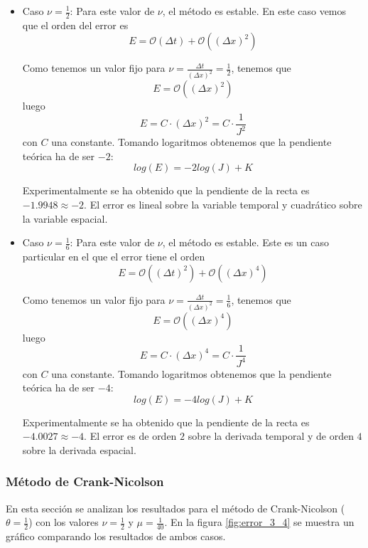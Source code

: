 \documentclass[spanish]{mathnotes}
\begin{document}
	
	\begin{itemize}
		\item Caso $\nu = \frac{1}{2}$: Para este valor de $\nu$, el método es estable. En este caso vemos que el orden del error es
		$$E = \mathcal{O}(\Delta t) + \mathcal{O}((\Delta x)^2)$$
		
		Como tenemos un valor fijo para $\nu=\frac{\Delta t}{(\Delta x)^2}=\frac{1}{2}$, tenemos que 
		$$E = \mathcal{O}((\Delta x)^2)$$
		luego 
		$$E = C\cdot (\Delta x)^2 = C\cdot\frac{1}{J^2}$$ 
		con $C$ una constante. Tomando logaritmos obtenemos que la pendiente teórica ha de ser $-2$:
		$$log(E) = -2log(J) + K$$
		
		Experimentalmente se ha obtenido que la pendiente de la recta es $-1.9948\approx -2$. El error es lineal sobre la variable temporal y cuadrático sobre la variable espacial.
		
		\item Caso $\nu = \frac{1}{6}$: Para este valor de $\nu$, el método es estable. Este es un caso particular en el que el error tiene el orden
		$$E = \mathcal{O}\left((\Delta t)^2\right) + \mathcal{O}\left((\Delta x)^4\right)$$
		
		Como tenemos un valor fijo para $\nu=\frac{\Delta t}{(\Delta x)^2}=\frac{1}{6}$, tenemos que 
		$$E = \mathcal{O}((\Delta x)^4)$$
		luego 
		$$E = C\cdot (\Delta x)^4 = C\cdot\frac{1}{J^4}$$ 
		con $C$ una constante. Tomando logaritmos obtenemos que la pendiente teórica ha de ser $-4$:
		$$log(E) = -4log(J) + K$$
		
		Experimentalmente se ha obtenido que la pendiente de la recta es $-4.0027\approx -4$.  El error es de orden $2$ sobre la derivada temporal y de orden $4$ sobre la derivada espacial.
	\end{itemize}
	
	\subsubsection{Método de Crank-Nicolson}
	En esta sección se analizan los resultados para el método de Crank-Nicolson ($\theta = \frac{1}{2}$) con los valores $\nu=\frac{1}{2}$ y $\mu=\frac{1}{40}$. En la figura \ref{fig:error_3_4} se muestra un gráfico comparando los resultados de ambos casos.
	
	
\end{document}
